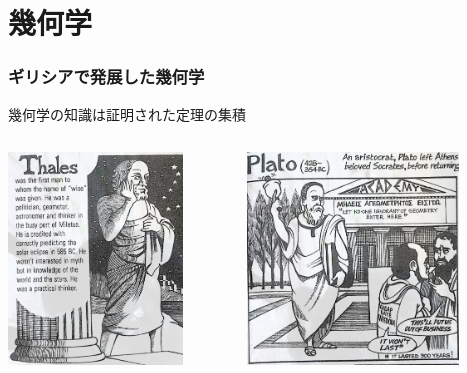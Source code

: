 \documentclass[unicode, 14pt, aspectratio=169]{beamer}
\begin{document}
\section{幾何学}
\begin{frame}
  \frametitle{ギリシアで発展した幾何学}
  {\large 幾何学の知識は証明された定理の集積}
\begin{columns}
  \begin{column}{0.25\textwidth}
    \begin{center}
      \includegraphics[width=0.8\textwidth]{images/thales.png}
    \end{center}
  \end{column}
  \begin{column}{0.25\textwidth}
    \begin{center}
      \includegraphics[width=0.8\textwidth]{images/plato.png}

\end{center}
\end{column}
\end{columns}
\end{frame}
\end{document}
